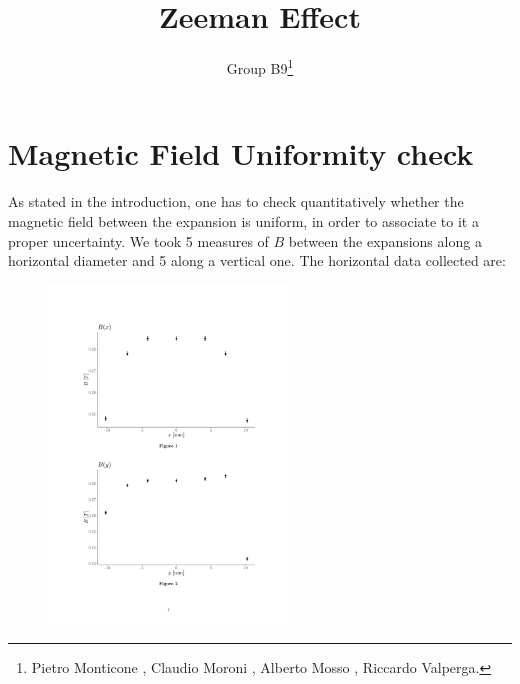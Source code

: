\documentclass[a4paper,12pt,abstracton]{scrartcl}
\title{Zeeman Effect}
\author{Group B9\footnote{Pietro Monticone , Claudio Moroni , Alberto Mosso , Riccardo Valperga.}}
\begin{document}
\maketitle
\makenomenclature
\newpage
\section{Magnetic Field Uniformity check}
As stated in the introduction, one has to check quantitatively whether the magnetic field between the expansion is uniform, in order to associate to it a proper uncertainty. We took 5 measures of $B$ between the expansions along a horizontal diameter and 5 along a vertical one.\newline
The horizontal data collected are:
\begin{table}[H]
\centering
\caption{}
\label{disX}
\end{table}

\begin{figure}[H]
\begin{center}
\includegraphics[trim=3cm 15cm 3cm 3cm, clip,height=9cm,keepaspectratio]{MagneticDishomogeneity.pdf}
\end{center}
\end{figure}
\end{document}
